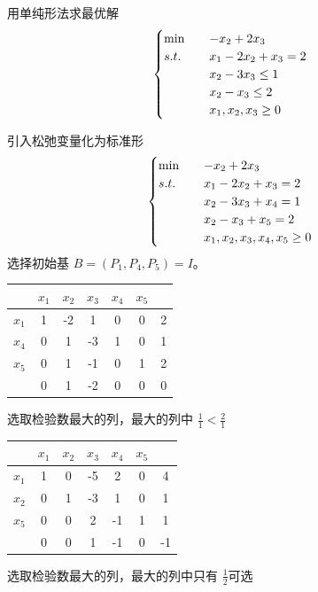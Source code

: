 \begin{example}
    用单纯形法求最优解
    \[
        \begin{cases}
            \min \quad &-x_2 + 2x_3\\
            s.t. \quad &x_1 - 2x_2 + x_3 = 2\\
            &x_2 - 3x_3 \le 1\\
            &x_2 - x_3 \le 2\\
            &x_1, x_2, x_3 \ge 0
        \end{cases}  
    \]

    \answer 引入松弛变量化为标准形
    \[
        \begin{cases}
            \min \quad &-x_2 + 2x_3\\
            s.t. \quad &x_1 - 2x_2 + x_3 = 2\\
            &x_2 - 3x_3 + x_4 = 1\\
            &x_2 - x_3 + x_5 = 2\\
            &x_1, x_2, x_3, x_4, x_5 \ge 0
        \end{cases}    
    \]
    选择初始基 $B = (P_1, P_4, P_5) = I$。
    \begin{center}
        \begin{tabular}{c|ccccc|c}
            & $x_1$ & $x_2$ & $x_3$ & $x_4$ & $x_5$ & \\
            \hline
            $x_1$ & 1 & -2 & 1 & 0 & 0 & 2\\
            $x_4$ & 0 & {\color{red} 1} & -3 & 1 & 0 & 1\\
            $x_5$ & 0 & 1 & -1 & 0 & 1 & 2\\
            \hline
             & 0 & 1 & -2 & 0 & 0 & 0
        \end{tabular}

        选取检验数最大的列，最大的列中 $\frac{1}{1} < \frac{2}{1}$

        \begin{tabular}{c|ccccc|c}
            & $x_1$ & $x_2$ & $x_3$ & $x_4$ & $x_5$ & \\
            \hline
            $x_1$ & 1 & 0 & -5 & 2 & 0 & 4\\
            $x_2$ & 0 & 1 & -3 & 1 & 0 & 1\\
            $x_5$ & 0 & 0 & {\color{red} 2} & -1 & 1 & 1\\
            \hline
            & 0 & 0 & 1 & -1 & 0 & -1
        \end{tabular}
        
        选取检验数最大的列，最大的列中只有 $\frac{1}{2}$可选


\end{center}
\end{example}
